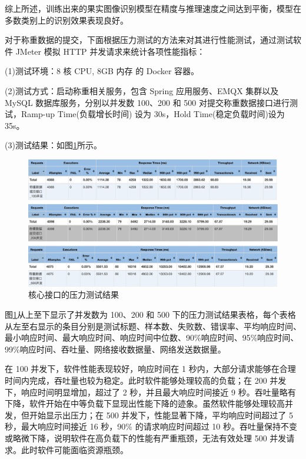 综上所述，训练出来的果实图像识别模型在精度与推理速度之间达到平衡，模型在多数类别上的识别效果表现良好。

对于称重数据的提交，下面根据压力测试的方法\cite{Zhu2017}来对其进行性能测试，通过测试软件 JMeter 模拟 HTTP 并发请求来统计各项性能指标：

(1)测试环境：8 核 CPU, 8GB 内存 的 Docker 容器。

(2)测试方式：启动称重相关服务，包含 Spring 应用服务、EMQX 集群以及MySQL 数据库服务，分别以并发数 100、200 和 500 对提交称重数据接口进行测试，Ramp-up Time(负载增长时间) 设为 30s，Hold Time(稳定负载时间)设为 35s。

(3)测试结果：如图\ref{fig:jmeter-test-result}所示。

\begin{figure}[H]
    \centering
    \includegraphics[width=0.95\linewidth]{../source/aws-test/jmeter-test-result.png}
    \caption{核心接口的压力测试结果}
    \label{fig:jmeter-test-result}
\end{figure}

图\ref{fig:jmeter-test-result}从上至下显示了并发数为 100、200 和 500 下的压力测试结果表格，每个表格从左至右显示的条目分别是测试标题、样本数、失败数、错误率、平均响应时间、最小响应时间、最大响应时间、响应时间中位数、90\%响应时间、95\%响应时间、99\%响应时间、吞吐量、网络接收数据量、网络发送数据量。

在 100 并发下，软件性能表现较好，响应时间在 1 秒内，大部分请求能够在合理时间内完成，吞吐量也较为稳定。此时软件能够处理较高的负载；在 200 并发下，响应时间明显增加，超过了 2 秒，并且最大响应时间接近 9 秒。吞吐量略有下降，软件开始在中等负载下显现出性能下降的迹象。虽然软件能够处理较高并发，但开始显示出压力；在 500 并发下，性能显著下降，平均响应时间超过了 5 秒，最大响应时间接近 16 秒，90\% 的请求响应时间超过 10 秒。吞吐量保持不变或略微下降，说明软件在高负载下的性能有严重瓶颈，无法有效处理 500 并发请求。此时软件可能面临资源瓶颈。


